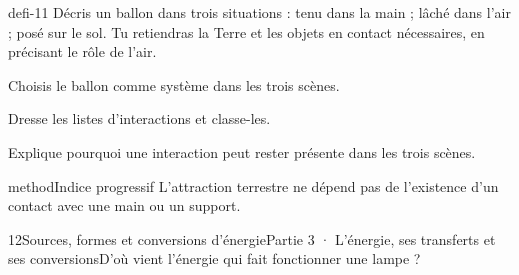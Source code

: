 \documentclass[12pt,twoside,openany]{book}
\begin{document}
\label{defi-ex-11}
\begin{pcFiche}{defi-11}
Décris un ballon dans trois situations : tenu dans la main ; lâché dans l’air ; posé sur le sol. Tu retiendras la Terre et les objets en contact nécessaires, en précisant le rôle de l’air.\par
{}
\begin{questions}
\item Choisis le ballon comme système dans les trois scènes.
\item Dresse les listes d’interactions et classe-les.
\item Explique pourquoi une interaction peut rester présente dans les trois scènes.
\end{questions}
\begin{pcEncadre}{method}{Indice progressif}
L’attraction terrestre ne dépend pas de l’existence d’un contact avec une main ou un support.\par
\end{pcEncadre}
\end{pcFiche}
\clearpage\pagestyle{otMain}
\begin{ouverture}[college3]{12}{Sources, formes et conversions d’énergie}{Partie 3 · L’énergie, ses transferts et ses conversions}{D’où vient l’énergie qui fait fonctionner une lampe ?}
\end{ouverture}
\label{ch-12-cours-1}
\label{ess-12}
\end{document}

